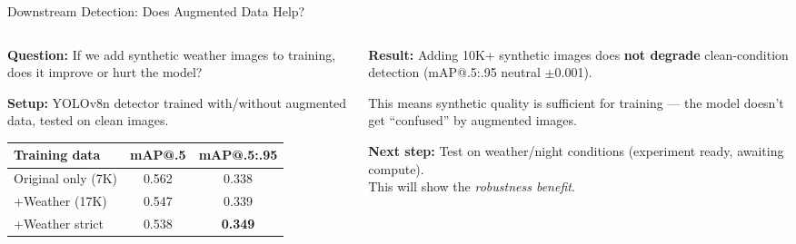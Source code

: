 \documentclass[aspectratio=169, 11pt]{beamer}
\begin{document}
\begin{frame}{Downstream Detection: Does Augmented Data Help?}

\begin{columns}[T]
\begin{column}{0.52\textwidth}
\textbf{Question:} If we add synthetic weather images to training, does it improve or hurt the model?

\vspace{0.3em}
\textbf{Setup:} YOLOv8n detector trained with/without augmented data, tested on clean images.

\vspace{0.3em}
\centering
\footnotesize
\begin{tabular}{lcc}
\toprule
\textbf{Training data} & \textbf{mAP@.5} & \textbf{mAP@.5:.95} \\
\midrule
Original only (7K) & 0.562 & 0.338 \\
+Weather (17K) & 0.547 & 0.339 \\
+Weather strict & 0.538 & \textbf{0.349} \\
\bottomrule
\end{tabular}
\end{column}
\begin{column}{0.46\textwidth}
\vspace{1em}
\textbf{Result:} Adding 10K+ synthetic images does \textbf{not degrade} clean-condition detection (mAP@.5:.95 neutral $\pm$0.001).

\vspace{0.5em}
This means synthetic quality is sufficient for training --- the model doesn't get ``confused'' by augmented images.

\vspace{0.5em}
{\color{noteorange}\textbf{Next step:}} Test on weather/night conditions (experiment ready, awaiting compute).\\
This will show the \textit{robustness benefit}.
\end{column}
\end{columns}
\end{frame}
\end{document}
